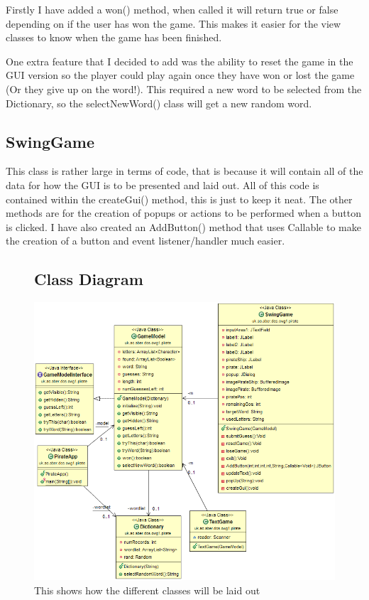 \documentclass[notitlepage]{report}
\begin{document}
Firstly I have added a won() method, when called it will return true or false depending on if the user has won the game. This makes it easier for the view classes to know when the game has been finished. 

One extra feature that I decided to add was the ability to reset the game in the GUI version so the player could play again once they have won or lost the game (Or they give up on the word!). This required a new word to be selected from the Dictionary, so the selectNewWord() class will get a new random word.

\subsection{SwingGame}
This class is rather large in terms of code, that is because it will contain all of the data for how the GUI is to be presented and laid out. All of this code is contained within the createGui() method, this is just to keep it neat. The other methods are for the creation of popups or actions to be performed when a button is clicked. I have also created an AddButton() method that uses Callable to make the creation of a button and event listener/handler much easier. 

\begin{figure}
\subsection{Class Diagram} 
  \centerline{\includegraphics[scale=0.7]{ClassDiagram}}
  \caption{This shows how the different classes will be laid out}
  \label{fig:label}
\end{figure}
\end{document}
